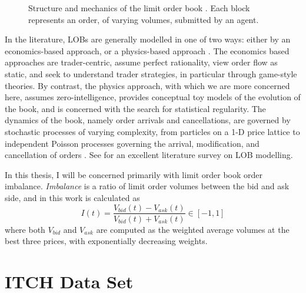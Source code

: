 \begin{figure}
  
\caption{Structure and mechanics of the limit order book \cite{AshBooth}. Each block represents an order, of varying volumes, submitted by an agent.}
\label{fig:LOB}
\end{figure}

In the literature, LOBs are generally modelled in one of two ways: either by an economics-based approach, or a physics-based approach \cite{Summary2013}. The economics based approaches are trader-centric, assume perfect rationality, view order flow as static, and seek to understand trader strategies, in particular through game-style theories. By contrast, the physics approach, with which we are more concerned here, assumes zero-intelligence, provides conceptual toy models of the evolution of the book, and is concerned with the search for statistical regularity. The dynamics of the book, namely order arrivals and cancellations, are governed by stochastic processes of varying complexity, from particles on a 1-D price lattice \cite{Bak97} to independent Poisson processes governing the arrival, modification, and cancellation of orders \cite{Cont10}. See \cite{Summary2013} for an excellent literature survey on LOB modelling.

In this thesis, I will be concerned primarily with limit order book order imbalance. \emph{Imbalance} is a ratio of limit order volumes between the bid and ask side, and in this work is calculated as 
\begin{equation}\label{eq:LOBImbalance}
I(t) = \dfrac{V_{bid}(t) - V_{ask}(t)}{V_{bid}(t) + V_{ask}(t)} \in [-1,1]
\end{equation}
where both $V_{bid}$ and $V_{ask}$ are computed as the weighted average volumes at the best three prices, with exponentially decreasing weights.

\section{ITCH Data Set}
